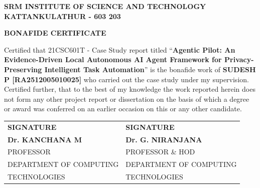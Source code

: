 \begin{center}
{\bfseries SRM INSTITUTE OF SCIENCE AND TECHNOLOGY\\ KATTANKULATHUR - 603 203\par}
\vspace{0.4in}
{\bfseries\large BONAFIDE CERTIFICATE\par}
\end{center}
\vspace{0.2in}
\noindent Certified that 21CSC601T - Case Study report titled ``\textbf{Agentic Pilot: An Evidence-Driven Local Autonomous AI Agent Framework for Privacy-Preserving Intelligent Task Automation}'' is the bonafide work of \textbf{SUDESH P [RA2512005010025]} who carried out the case study under my supervision. Certified further, that to the best of my knowledge the work reported herein does not form any other project report or dissertation on the basis of which a degree or award was conferred on an earlier occasion on this or any other candidate.

\vspace{1.8in}
\noindent
\begin{tabular}{@{}p{}p{}@{}}
\textbf{SIGNATURE} & \textbf{SIGNATURE}\\[0.6in]
\textbf{Dr. KANCHANA M} & \textbf{Dr. G. NIRANJANA}\\
PROFESSOR & PROFESSOR \& HOD\\
DEPARTMENT OF COMPUTING & DEPARTMENT OF COMPUTING\\
TECHNOLOGIES & TECHNOLOGIES\\
\end{tabular}
\clearpage

